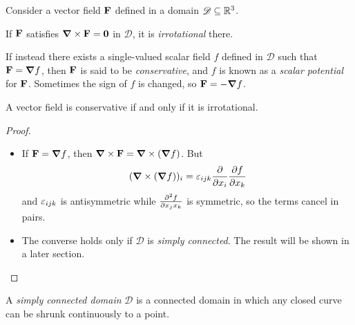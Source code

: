 \documentclass{../../template/note}
\begin{document}
    Consider a vector field \(\V F\) defined in a domain \(\mathscr D \subseteq \mathbb R^3\).

    \begin{definition*}
        If \(\V F\) satisfies \(\curl \V F = \V 0\) in \(\mathscr D\), it is \emph{irrotational} there.
    \end{definition*}

    \begin{definition*}
        If instead there exists a single-valued scalar field \(f\) defined in \(\mathscr D\) such that \(\V F = \grad f\), then \(\V F\) is said to be \emph{conservative}, and \(f\) is known as a \emph{scalar potential} for \(\V F\). Sometimes the sign of \(f\) is changed, so \(\V F = -\grad f\).
    \end{definition*}
    
    \begin{proposition}
        A vector field is conservative if and only if it is irrotational.
    \end{proposition}
    
    \begin{proof}
        \begin{itemize}
            \item[\(\implies\)] If \(\V F = \grad f\), then \(\curl \V F = \curl (\grad f)\). But
            \begin{align*}
                (\curl (\grad f))_i = \lv{ijk} \pd{}{x_i} \pd{f}{x_k}
            \end{align*}
            and \(\varepsilon_{ijk}\) is antisymmetric while \(\pd{^2f}{x_jx_k}\) is symmetric, so the terms cancel in pairs.
            \item[\(\impliedby\)] The converse holds only if \(\mathscr D\) is \emph{simply connected}. The result will be shown in a later section.            
        \end{itemize}
    \end{proof}
    
    \begin{definition*}
        A \emph{simply connected domain} \(\mathscr D\) is a connected domain in which any closed curve can be shrunk continuously to a point.
    \end{definition*}
    
\end{document}

